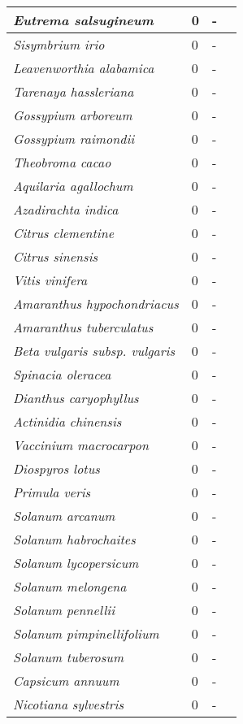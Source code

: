 {\begin{longtable}{| L{4cm} | L{2cm}  | L{5cm} | L{4cm} |}
\textit{Eutrema salsugineum} & 0 & - & \\ \hline
\textit{Sisymbrium irio} & 0 & - & \\ \hline
\textit{Leavenworthia alabamica} & 0 & - & \\ \hline
\textit{Tarenaya hassleriana} & 0 & - & \\ \hline
\textit{Gossypium arboreum} & 0 & - & \\ \hline
\textit{Gossypium raimondii} & 0 & - & \\ \hline
\textit{Theobroma cacao} & 0 & - & \\ \hline
\textit{Aquilaria agallochum} & 0 & - & \\ \hline
\textit{Azadirachta indica} & 0 & - & \\ \hline
\textit{Citrus clementine} & 0 & - & \\ \hline
\textit{Citrus sinensis} & 0 & - & \\ \hline
\textit{Vitis vinifera} & 0 & - & \\ \hline
\textit{Amaranthus hypochondriacus} & 0 & - & \\ \hline
\textit{Amaranthus tuberculatus} & 0 & - & \\ \hline
\textit{Beta vulgaris subsp. vulgaris} & 0 & - & \\ \hline
\textit{Spinacia oleracea} & 0 & - & \\ \hline
\textit{Dianthus caryophyllus} & 0 & - & \\ \hline
\textit{Actinidia chinensis} & 0 & - & \\ \hline
\textit{Vaccinium macrocarpon} & 0 & - & \\ \hline
\textit{Diospyros lotus} & 0 & - & \\ \hline
\textit{Primula veris} & 0 & - & \\ \hline
\textit{Solanum arcanum} & 0 & - & \\ \hline
\textit{Solanum habrochaites} & 0 & - & \\ \hline
\textit{Solanum lycopersicum} & 0 & - & \\ \hline
\textit{Solanum melongena} & 0 & - & \\ \hline
\textit{Solanum pennellii} & 0 & - & \\ \hline
\textit{Solanum pimpinellifolium} & 0 & - & \\ \hline
\textit{Solanum tuberosum} & 0 & - & \\ \hline
\textit{Capsicum annuum} & 0 & - & \\ \hline
\textit{Nicotiana sylvestris} & 0 & - & \\ \hline

\end{longtable}}
